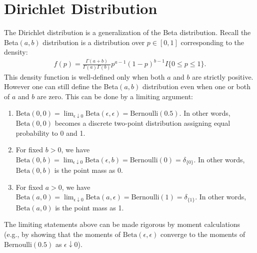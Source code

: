 \documentclass{scrartcl}
\begin{document}
\section{Dirichlet Distribution}
The Dirichlet distribution is a generalization of the Beta
distribution. Recall the Beta$(a, b)$ distribution is a distribution
over $p \in [0, 1]$ corresponding to the density:
\begin{align*}
  f(p) = \frac{\Gamma(a + b)}{\Gamma(a) \Gamma(b)} p^{a-1} (1 -
  p)^{b-1} I\{0 \leq p \leq 1\}. 
\end{align*}
This density function is well-defined only when both $a$ and $b$ are
strictly positive. However one can still define the Beta$(a, b)$
distribution even when one or both of $a$ and $b$ are zero. This can
be done by a limiting argument: 
\begin{enumerate}
\item $\text{Beta}(0, 0) = \lim_{\epsilon \downarrow 0}
  \text{Beta}(\epsilon, \epsilon) = \text{Bernoulli}(0.5)$. In other
  words, $\text{Beta}(0, 0)$ becomes a discrete two-point distribution assigning
  equal probability to 0 and 1.
\item For fixed $b > 0$, we have $\text{Beta}(0, b) = \lim_{\epsilon
    \downarrow 0} \text{Beta}(\epsilon, b) = \text{Bernoulli}(0) = 
  \delta_{\{0\}}$. In other words, $\text{Beta}(0, b)$ is the point
  mass as 0.
\item For fixed $a > 0$, we have $\text{Beta}(a, 0) = \lim_{\epsilon
    \downarrow 0} \text{Beta}(a, \epsilon) = \text{Bernoulli}(1) = 
  \delta_{\{1\}}$. In other words, $\text{Beta}(a, 0)$ is the point
  mass as 1.  
\end{enumerate}
The limiting statements above can be made rigorous by
moment calculations (e.g., by showing that the moments of
$\text{Beta}(\epsilon, \epsilon)$ converge to the moments of
$\text{Bernoulli}(0.5)$ as $\epsilon \downarrow 0$).
\end{document}

